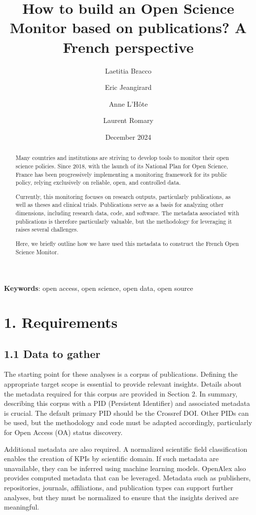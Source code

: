 \documentclass[
]{article}
\title{How to build an Open Science Monitor based on publications? A
French perspective}
\author[%
  2%
  ]{%
  Laetitia Bracco%
}
\author[%
  1%
  ]{%
  Eric Jeangirard%
}
\author[%
  1%
  ]{%
  Anne L'Hôte%
}
\author[%
  3%
  ]{%
  Laurent Romary%
}
\affil[1]{French Ministry of Higher Education and Research, Paris,
France}
\affil[2]{University of Lorraine, France}
\affil[3]{INRIA, France}
\date{December 2024}
\begin{document}
\maketitle
\begin{abstract}
Many countries and institutions are striving to develop tools to monitor
their open science policies. Since 2018, with the launch of its National
Plan for Open Science, France has been progressively implementing a
monitoring framework for its public policy, relying exclusively on
reliable, open, and controlled data.

Currently, this monitoring focuses on research outputs, particularly
publications, as well as theses and clinical trials. Publications serve
as a basis for analyzing other dimensions, including research data,
code, and software. The metadata associated with publications is
therefore particularly valuable, but the methodology for leveraging it
raises several challenges.

Here, we briefly outline how we have used this metadata to construct the
French Open Science Monitor.
\end{abstract}

\textbf{Keywords}: open access, open science, open data, open source

\hypertarget{requirements}{%
\section{1. Requirements}\label{requirements}}

\hypertarget{data-to-gather}{%
\subsection{1.1 Data to gather}\label{data-to-gather}}

The starting point for these analyses is a corpus of publications.
Defining the appropriate target scope is essential to provide relevant
insights. Details about the metadata required for this corpus are
provided in Section 2. In summary, describing this corpus with a PID
(Persistent Identifier) and associated metadata is crucial. The default
primary PID should be the Crossref DOI. Other PIDs can be used, but the
methodology and code must be adapted accordingly, particularly for Open
Access (OA) status discovery.

Additional metadata are also required. A normalized scientific field
classification enables the creation of KPIs by scientific domain. If
such metadata are unavailable, they can be inferred using machine
learning models. OpenAlex also provides computed metadata that can be
leveraged. Metadata such as publishers, repositories, journals,
affiliations, and publication types can support further analyses, but
they must be normalized to ensure that the insights derived are
meaningful.
\end{document}
